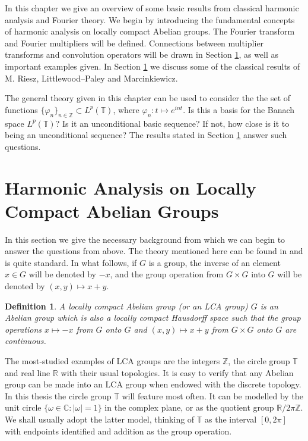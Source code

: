\documentclass[honours,12pt]{unswthesis}
\newcommand{\R}{\mathbb{R}}
\newcommand{\C}{\mathbb{C}}
\newcommand{\T}{\mathbb{T}}
\newcommand{\Z}{\mathbb{Z}}
\newtheorem{definition}[theorem]{Definition}
\numberwithin{equation}{section}
\begin{document}
In this chapter we give an overview of some basic results from classical
harmonic analysis and Fourier theory.
We begin by introducing the fundamental concepts of harmonic analysis on locally
compact Abelian groups. The Fourier transform and Fourier multipliers will be
defined. Connections between multiplier transforms and convolution operators 
will
be drawn in Section \ref{lca}, as well as important examples given. In
Section \ref{lca} we discuss some of the classical results of M. Riesz,
Littlewood--Paley and Marcinkiewicz.

The general theory given in this chapter can be used to consider the
the set of functions $\{\varphi_n\}_{n\in\Z}\subset L^p(\T)$, where
$\varphi_n:t\mapsto e^{int}$. Is this a basis for the Banach space $L^p(\T)$?
Is it an unconditional basic sequence? If not, how close is it
to being an unconditional sequence? The results stated in Section 
\ref{lca}
answer such questions.




\section{Harmonic Analysis on Locally Compact Abelian Groups}\label{lca}


In this section we give the necessary background from which we can begin to
answer
the questions from
above. The theory mentioned here can be found in \cite{Katznelson}
and is quite 
standard. In what follows, if $G$ is a group, the inverse of an
element $x\in G$ will be denoted by $-x$, and the group operation from
$G\times G$ into $G$ will be denoted by $(x,y)\mapsto x+y$. 


\begin{definition} A {\em locally compact Abelian group} (or an LCA group)
$G$ is an Abelian group
which is also a locally compact Hausdorff space such that the group operations
$x\mapsto -x$ from $G$ onto $G$ and $(x,y)\mapsto x+y$ from $G\times G$
onto $G$ are continuous. 
\end{definition}

The most-studied examples of LCA groups are the integers $\Z$, the circle group
$\T$ and real line $\R$ with their usual topologies. 
It is easy to verify that any Abelian group can be made into an LCA group
when endowed with the discrete topology. In this thesis the circle group $\T$
will feature most often. It can be modelled by the unit circle
$\{\omega\in\C:|\omega|=1\}$
in the complex plane, or as the quotient group $\R/2\pi\Z$. We shall usually
adopt the latter model,
thinking of $\T$ as the interval $[0,2\pi]$ with endpoints identified and
addition as the group operation.
\end{document}
